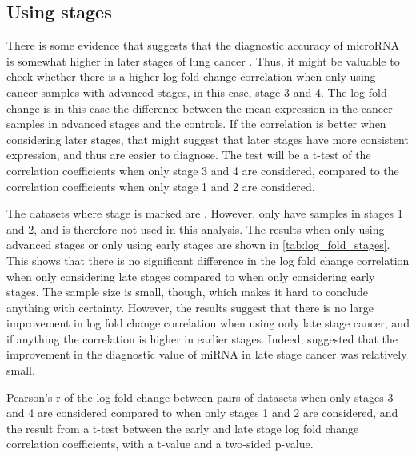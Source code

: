 {{\subsection{Using stages}
There is some evidence that suggests that the diagnostic accuracy of microRNA is somewhat higher in later stages of lung cancer \citep{later_better}. Thus, it might be valuable to check whether there is a higher log fold change correlation when only using cancer samples with advanced stages, in this case, stage 3 and 4. The log fold change is in this case  the difference between the mean expression in the cancer samples in advanced stages and the controls. If the correlation is better when considering later stages, that might suggest that later stages have more consistent expression, and thus are easier to diagnose. The test will be a t-test of the correlation coefficients when only stage 3 and 4 are considered, compared to the correlation coefficients when only stage 1 and 2 are considered.

The datasets where stage is marked are \citet{Abdollahi2019,Bianchi2011,Zaporozhchenko2018,Duan2021,Boeri2011,Leidinger2011,Qu2017,Li2017,Nigita2018}. However, \citet{Duan2021} only have samples in stages 1 and 2, and is therefore not used in this analysis. The results when only using advanced stages or only using early stages are shown in \autoref{tab:log_fold_stages}. This shows that there is no significant difference in the log fold change correlation when only considering late stages compared to when only considering early stages. The sample size is small, though, which makes it hard to conclude anything with certainty. However, the results suggest that there is no large improvement in log fold change correlation when using only late stage cancer, and if anything the correlation is higher in earlier stages. Indeed, \citet{later_better} suggested that the improvement in the diagnostic value of miRNA in late stage cancer was relatively small.


\begin{table}
    \caption{Pearson's r of the log fold change between pairs of datasets when only stages 3 and 4 are considered compared to when only stages 1 and 2 are considered, and the result from a t-test between the early and late stage log fold change correlation coefficients, with a t-value and a two-sided p-value.}
    \label{tab:log_fold_stages}
    \begin{center}
    \end{center}
\end{table}



}}
